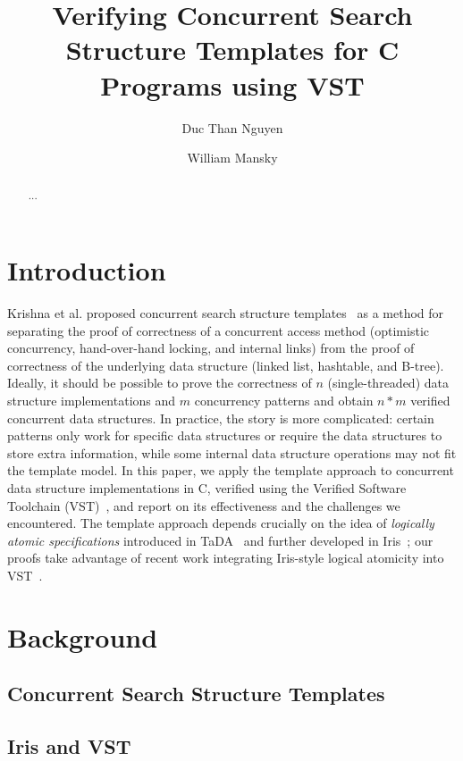 \documentclass[a4paper,UKenglish,cleveref, autoref, thm-restate]{lipics-v2021}
\title{Verifying Concurrent Search Structure Templates for C Programs using VST} %
\author{Duc Than Nguyen}{University of Illinois at Chicago, USA \and \url{http://www.myhomepage.edu} }{johnqpublic@dummyuni.org}{https://orcid.org/0000-0002-1825-0097}{(Optional) author-specific funding acknowledgements}%
\author{William Mansky}{University of Illinois at Chicago, USA}{joanrpublic@dummycollege.org}{[orcid]}{[funding]}
\begin{document}
\maketitle

\begin{abstract}
... 
\end{abstract}

\section{Introduction}
\label{sec:introduction}
Krishna et al. proposed concurrent search structure templates~\cite{templates} as a method for separating the proof of correctness of a concurrent access method (optimistic concurrency, hand-over-hand locking, and internal links) from the proof of correctness of the underlying data structure (linked list, hashtable, and B-tree). Ideally, it should be possible to prove the correctness of $n$ (single-threaded) data structure implementations and $m$ concurrency patterns and obtain $n * m$ verified concurrent data structures. In practice, the story is more complicated: certain patterns only work for specific data structures or require the data structures to store extra information, while some internal data structure operations may not fit the template model. In this paper, we apply the template approach to concurrent data structure implementations in C, verified using the Verified Software Toolchain (VST)~\cite{plfcc}, and report on its effectiveness and the challenges we encountered. The template approach depends crucially on the idea of \emph{logically atomic specifications} introduced in TaDA~\cite{tada} and further developed in Iris~\cite{iris}; our proofs take advantage of recent work integrating Iris-style logical atomicity into VST~\cite{mansky2022bringing}.

\section{Background}
\subsection{Concurrent Search Structure Templates}

\subsection{Iris and VST}
\end{document}

